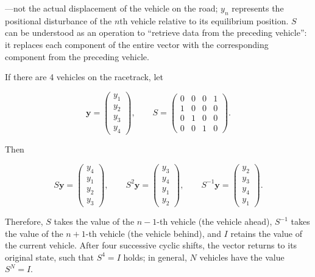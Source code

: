\documentclass[11pt,a4paper,openany]{book}
\numberwithin{equation}{chapter}
\numberwithin{figure}{chapter}
\numberwithin{table}{chapter}
\begin{document}
—not the actual displacement of the vehicle on the road; $y_n$ represents the positional disturbance of the $n$th vehicle relative to its equilibrium position. $S$ can be understood as an operation to “retrieve data from the preceding vehicle”: it replaces each component of the entire vector with the corresponding component from the preceding vehicle.










\begin{tcolorbox}[experimentbox,title=\textbf{Understanding the shift operator using 4 vehicles as an example}]

If there are 4 vehicles on the racetrack, let

\[
\mathbf y=
\begin{pmatrix}y_1\\y_2\\y_3\\y_4\end{pmatrix},
\qquad
S=
\begin{pmatrix}
0&0&0&1\\
1&0&0&0\\
0&1&0&0\\
0&0&1&0
\end{pmatrix}.
\]




Then




\[
S\mathbf y=
\begin{pmatrix}y_4\\y_1\\y_2\\y_3\end{pmatrix},
\qquad
S^2\mathbf y=
\begin{pmatrix}y_3\\y_4\\y_1\\y_2\end{pmatrix},
\qquad
S^{-1}\mathbf y=
\begin{pmatrix}y_2\\y_3\\y_4\\y_1\end{pmatrix}.
\]




Therefore, $S$ takes the value of the $n-1$-th vehicle (the vehicle ahead), $S^{-1}$ takes the value of the $n+1$-th vehicle (the vehicle behind), and $I$ retains the value of the current vehicle. After four successive cyclic shifts, the vector returns to its original state, such that $S^4=I$ holds; in general, $N$ vehicles have the value $S^N=I$.
\end{tcolorbox}
\end{document}
